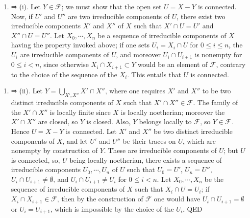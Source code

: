 \documentclass[
]{article}
\providecommand{\tightlist}{%
  \setlength{\itemsep}{0pt}\setlength{\parskip}{0pt}}
\begin{document}
\begin{enumerate}
\def\labelenumi{(\roman{enumi})}
\setcounter{enumi}{1}
\tightlist
\item
  ⇒ (i). Let \(Y \in \mathcal{F}\); we must show that the open set
  \(U = X - Y\) is connected. Now, if \(U'\) and \(U''\) are two
  irreducible components of \(U\), there exist two irreducible
  components \(X'\) and \(X''\) of \(X\) such that \(X' \cap U = U'\)
  and \(X'' \cap U = U''\). Let \(X_{0}, \cdots, X_{n}\) be a sequence
  of irreducible components of \(X\) having the property invoked above;
  if one sets \(U_{i} = X_{i} \cap U\) for
  \(0 \leqslant i \leqslant n\), the \(U_{i}\) are irreducible
  components of \(U\), and moreover \(U_{i} \cap U_{i+1}\) is nonempty
  for \(0 \leqslant i < n\), since otherwise
  \(X_{i} \cap X_{i+1} \subset Y\) would be an element of
  \(\mathcal{F}\), contrary to the choice of the sequence of the
  \(X_{i}\). This entails that \(U\) is connected.
\end{enumerate}

\begin{enumerate}
\def\labelenumi{(\roman{enumi})}
\tightlist
\item
  ⇒ (ii). Let \(Y = \bigcup_{X', X''} X' \cap X''\), where one requires
  \(X'\) and \(X''\) to be two distinct irreducible components of \(X\)
  such that \(X' \cap X'' \in \mathcal{F}\). The family of the
  \(X' \cap X''\) is locally finite since \(X\) is locally noetherian;
  moreover the \(X' \cap X''\) are closed, so \(Y\) is closed. Also,
  \(Y\) belongs locally to \(\mathcal{F}\), so \(Y \in \mathcal{F}\).
  Hence \(U = X - Y\) is connected. Let \(X'\) and \(X''\) be two
  distinct irreducible components of \(X\), and let \(U'\) and \(U''\)
  be their traces on \(U\), which are nonempty by construction of \(Y\).
  These are irreducible components of \(U\); but \(U\) is connected, so,
  \(U\) being locally noetherian, there exists a sequence of irreducible
  components \(U_{0}, \cdots, U_{n}\) of \(U\) such that \(U_{0} = U'\),
  \(U_{n} = U''\), \(U_{i} \cap U_{i+1} \neq \emptyset\), and
  \(U_{i} \cap U_{i+1} \neq U_{i}\) for \(0 \leqslant i < n\). Let
  \(X_{0}, \cdots, X_{n}\) be the sequence of irreducible components of
  \(X\) such that \(X_{i} \cap U = U_{i}\); if
  \(X_{i} \cap X_{i+1} \in \mathcal{F}\), then by the construction of
  \(\mathcal{F}\) one would have \(U_{i} \cap U_{i+1} = \emptyset\) or
  \(U_{i} = U_{i+1}\), which is impossible by the choice of the
  \(U_{i}\). QED
\end{enumerate}
\end{document}
